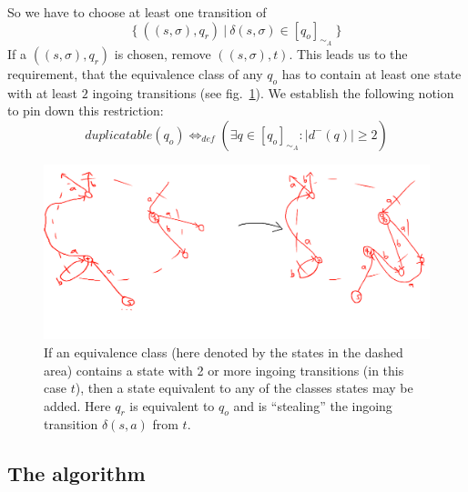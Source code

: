 So we have to choose at least one transition of
\[
	\{\ ((s, \sigma), q_r)\ |\ \delta(s,\sigma) \in [q_o]_{\sim_A}\ \}
\]
If a $((s, \sigma), q_r)$ is chosen, remove $((s, \sigma), t)$. This leads us to the requirement, that the equivalence class of any $q_o$ has to contain at least one state with at least $2$ ingoing transitions (see fig.~\ref{fig:dfa_add_redundant_states}). We establish the following notion to pin down this restriction:
\[
	duplicatable(q_o) \Leftrightarrow_{def} (\exists q \in [q_o]_{\sim_A}\colon |d^-(q)| \geq 2)
\]
\begin{figure}
	\includegraphics[width=\linewidth]{images/dfa_add_redundant_states.png}
	\caption{If an equivalence class (here denoted by the states in the dashed area) contains a state with 2 or more ingoing transitions (in this case $t$), then a state equivalent to any of the classes states may be added. Here $q_r$ is equivalent to $q_o$ and is ``stealing'' the ingoing transition $\delta(s, a)$ from $t$.}
	\label{fig:dfa_add_redundant_states}
\end{figure}

\subsection{The algorithm}

